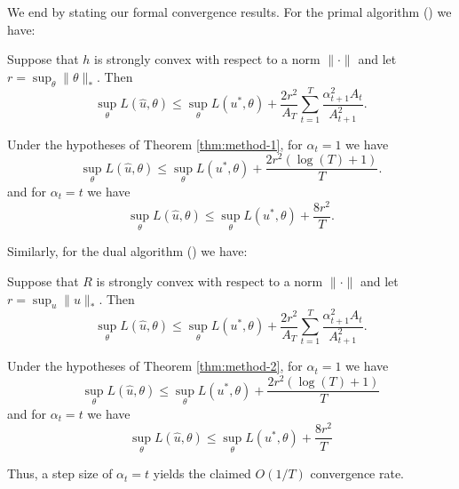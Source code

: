\documentclass{article} %
\begin{document}
We end by stating our formal convergence results. For the primal algorithm 
(\primal) we have:
\begin{theorem}
\label{thm:method-1}
Suppose that $h$ is strongly convex with respect to a norm $\|\cdot\|$ 
and let $r = \sup_{\theta} \|\theta\|_{*}$. Then 
\[ \sup_{\theta} L(\hat{u}, \theta) \leq \sup_{\theta} L(u^*, \theta) + \frac{2r^2}{A_T} \sum_{t=1}^T \frac{\alpha_{t+1}^2A_t}{A_{t+1}^2}. \]
\end{theorem}
\begin{corollary} 
\label{cor:method-1}
Under the hypotheses of Theorem \ref{thm:method-1}, for $\alpha_{t} = 1$ we have
\[ \sup_{\theta} L(\hat{u}, \theta) \leq \sup_{\theta} L(u^*, \theta) + \frac{2r^2 (\log (T) + 1)}{T}. \]
and for $\alpha_t = t$ we have
\[ \sup_{\theta} L(\hat{u}, \theta) \leq \sup_{\theta} L(u^*, \theta) + \frac{8r^2}{T}. \]
\end{corollary}
Similarly, for the dual algorithm (\dual) we have:
\begin{theorem}
\label{thm:method-2}
Suppose that $R$ is strongly convex with respect to a norm $\|\cdot\|$ 
and let $r = \sup_{u} \|u\|_{*}$. Then 
\[ \sup_{\theta} L(\hat{u}, \theta) \leq \sup_{\theta} L(u^*, \theta) + \frac{2r^2}{A_T} \sum_{t=1}^T \frac{\alpha_{t+1}^2A_t}{A_{t+1}^2}. \]
\end{theorem}
\begin{corollary}
\label{cor:method-2}
Under the hypotheses of Theorem \ref{thm:method-2}, for $\alpha_t = 1$ we have
\[ \sup_{\theta} L(\hat{u}, \theta) \leq \sup_{\theta} L(u^*, \theta) + \frac{2r^2(\log(T) + 1)}{T} \]
and for $\alpha_t = t$ we have
\[ \sup_{\theta} L(\hat{u}, \theta) \leq \sup_{\theta} L(u^*, \theta) + \frac{8r^2}{T} \]
\end{corollary}
Thus, a step size of $\alpha_t = t$ yields the claimed $O(1/T)$ convergence rate.



\end{document}
